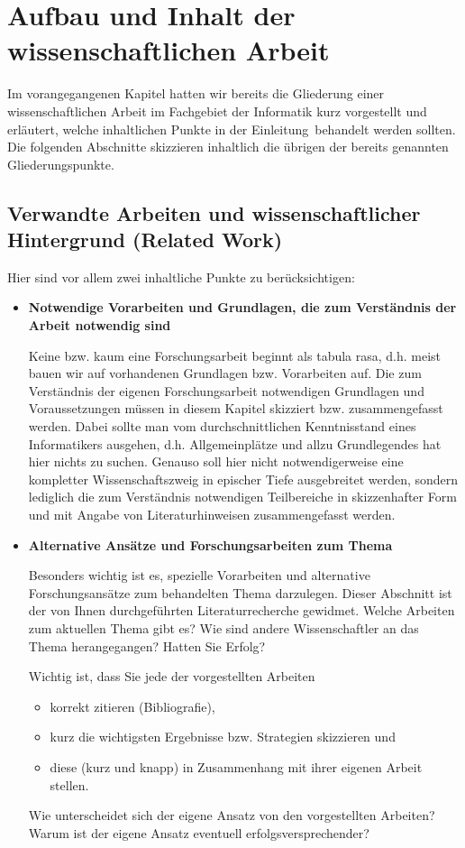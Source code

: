%
\section{Aufbau und Inhalt der wissenschaftlichen Arbeit}
\label{sec_aufbau}

Im vorangegangenen Kapitel hatten wir bereits die Gliederung einer wissenschaftlichen Arbeit im Fachgebiet der Informatik kurz vorgestellt und erläutert, welche inhaltlichen Punkte in der \glqq Einleitung\grqq\, behandelt werden sollten.
Die folgenden Abschnitte skizzieren inhaltlich die übrigen der bereits genannten Gliederungspunkte.

\subsection{Verwandte Arbeiten und wissenschaftlicher Hintergrund (Related Work)}
Hier sind vor allem zwei inhaltliche Punkte zu berücksichtigen:
\begin{itemize}
\item {\bf Notwendige Vorarbeiten und Grundlagen, die zum Verständnis der Arbeit notwendig sind}

Keine bzw. kaum eine Forschungsarbeit beginnt als \glqq tabula rasa\grqq , d.h. meist bauen wir auf  vorhandenen Grundlagen bzw. Vorarbeiten auf.
Die zum Verständnis der eigenen Forschungsarbeit notwendigen Grundlagen und Voraussetzungen müssen in diesem Kapitel skizziert bzw. zusammengefasst werden.
Dabei sollte man vom durchschnittlichen Kenntnisstand eines Informatikers ausgehen, d.h. Allgemeinplätze und allzu Grundlegendes hat hier nichts zu suchen.
Genauso soll hier nicht notwendigerweise eine kompletter Wissenschaftszweig in epischer Tiefe ausgebreitet werden, sondern lediglich die zum Verständnis notwendigen Teilbereiche in skizzenhafter Form und mit Angabe von Literaturhinweisen zusammengefasst werden.

\smallskip

\item {\bf Alternative Ansätze und Forschungsarbeiten zum Thema}

Besonders wichtig ist es, spezielle Vorarbeiten und alternative Forschungsansätze zum behandelten Thema darzulegen.
Dieser Abschnitt ist der von Ihnen durchgeführten Literaturrecherche gewidmet.
Welche Arbeiten zum aktuellen Thema gibt es? Wie sind andere Wissenschaftler an das Thema herangegangen? Hatten Sie Erfolg?

Wichtig ist, dass Sie jede der vorgestellten Arbeiten 
\begin{itemize}
\item korrekt zitieren (Bibliografie),
\item kurz die wichtigsten Ergebnisse bzw. Strategien skizzieren und
\item diese (kurz und knapp) in Zusammenhang mit ihrer eigenen Arbeit stellen. 
\end{itemize}
Wie unterscheidet sich der eigene Ansatz von den vorgestellten Arbeiten? 
Warum ist der eigene Ansatz eventuell erfolgsversprechender? 

\end{itemize}


